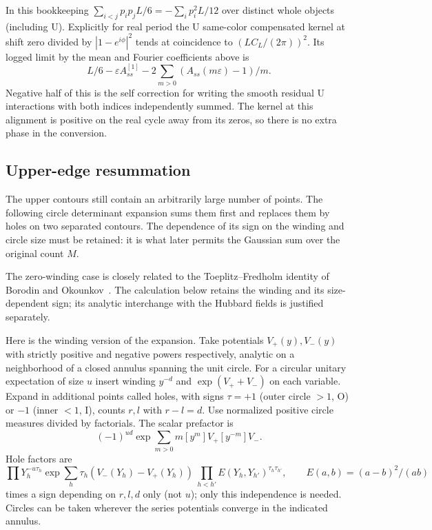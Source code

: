 In this bookkeeping \(\sum_{i<j}p_i p_j L/6=-\sum_i p_i^2 L/12\) over distinct whole objects (including U). Explicitly for real period the U same-color compensated kernel at shift zero divided by \(|1-e^{i\phi}|^2\) tends at coincidence to \((LC_L/(2\pi))^2\). Its logged limit by the mean and Fourier coefficients above is
\[
 L/6-\varepsilon A_{ss}^{[1]}-2\sum_{m>0}(A_{ss}(m\varepsilon)-1)/m .
\]
Negative half of this is the self correction for writing the smooth residual U interactions with both indices independently summed. The kernel at this alignment is positive on the real cycle away from its zeros, so there is no extra phase in the conversion.

\subsection{Upper-edge resummation}\label{c01-c1-upper-edge-resummation}

The upper contours still contain an arbitrarily large number of points. The following circle determinant expansion sums them first and replaces them by holes on two separated contours. The dependence of its sign on the winding and circle size must be retained: it is what later permits the Gaussian sum over the original count \(M\).

The zero-winding case is closely related to the Toeplitz--Fredholm identity of Borodin and Okounkov~\cite[Theorem~1]{BorodinOkounkov2000}. The calculation below retains the winding and its size-dependent sign; its analytic interchange with the Hubbard fields is justified separately.

Here is the winding version of the expansion. Take potentials \(V_+(y),V_-(y)\) with strictly positive and negative powers respectively, analytic on a neighborhood of a closed annulus spanning the unit circle. For a circular unitary expectation of size \(u\) insert winding \(y^{-d}\) and \(\exp(V_++V_-)\) on each variable. Expand in additional points called holes, with signs \(\tau=+1\) (outer circle \(>1\), O) or \(-1\) (inner \(<1\), I), counts \(r,l\) with \(r-l=d\). Use normalized positive circle measures divided by factorials. The scalar prefactor is
\[
 (-1)^{ud}\exp\sum_{m>0}m [y^m]V_+ [y^{-m}]V_- .
\]
Hole factors are
\[
 \prod Y_h^{-u\tau_h}\exp\sum_h\tau_h(V_-(Y_h)-V_+(Y_h))\ 
 \prod_{h<h'} E(Y_h,Y_{h'})^{\tau_h\tau_{h'}},\qquad E(a,b)=(a-b)^2/(ab)
\]
times a sign depending on \(r,l,d\) only (not \(u\)); only this independence is needed. Circles can be taken wherever the series potentials converge in the indicated annulus.

